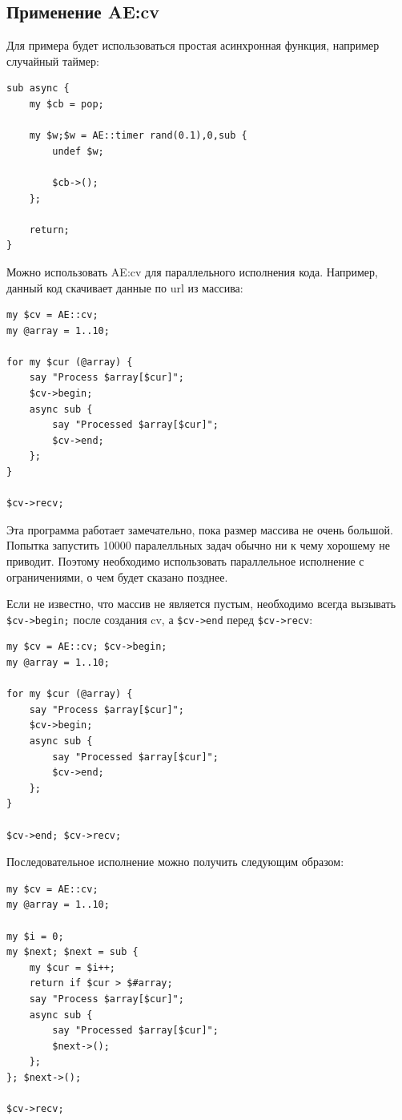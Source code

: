 \subsection{Применение AE:cv}
Для примера будет использоваться простая асинхронная функция, например случайный таймер:
\begin{verbatim}
sub async {
    my $cb = pop;

    my $w;$w = AE::timer rand(0.1),0,sub {
        undef $w;

        $cb->();
    };

    return;
}
\end{verbatim}

Можно использовать AE:cv для параллельного исполнения кода. Например, данный код скачивает данные по url из массива:
\begin{verbatim}
my $cv = AE::cv;
my @array = 1..10;

for my $cur (@array) {
    say "Process $array[$cur]";
    $cv->begin;
    async sub {
        say "Processed $array[$cur]";
        $cv->end;
    };
}

$cv->recv;
\end{verbatim}
Эта программа работает замечательно, пока размер массива не очень большой. Попытка запустить 10000 паралелльных задач обычно ни к чему хорошему не приводит. Поэтому необходимо использовать параллельное исполнение с ограничениями, о чем будет сказано позднее.

Если не известно, что массив не является пустым, необходимо всегда вызывать \verb|$cv->begin;| после создания cv, а \verb|$cv->end| перед \verb|$cv->recv|:
\begin{verbatim}
my $cv = AE::cv; $cv->begin;
my @array = 1..10;

for my $cur (@array) {
    say "Process $array[$cur]";
    $cv->begin;
    async sub {
        say "Processed $array[$cur]";
        $cv->end;
    };
}

$cv->end; $cv->recv;
\end{verbatim}
Последовательное исполнение можно получить следующим образом:
\begin{verbatim}
my $cv = AE::cv;
my @array = 1..10;

my $i = 0;
my $next; $next = sub {
    my $cur = $i++;
    return if $cur > $#array;
    say "Process $array[$cur]";
    async sub {
        say "Processed $array[$cur]";
        $next->();
    };
}; $next->();

$cv->recv;
\end{verbatim}

